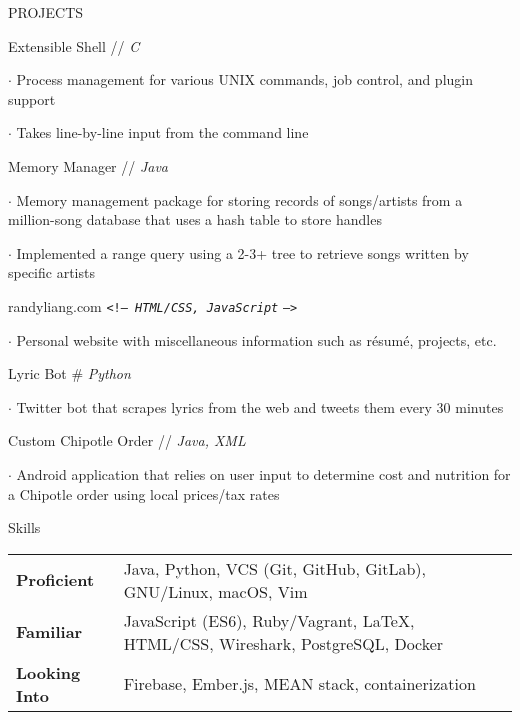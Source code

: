 \documentclass{resume} %
\begin{document}
\begin{rSection}{PROJECTS}

\begin{rSubsection}{Extensible Shell // \sl C}{}{}{} 
	\item[$\cdot$] Process management for various UNIX commands, job control, and plugin support
    \item[$\cdot$] Takes line-by-line input from the command line
\end{rSubsection}
\begin{rSubsection}{Memory Manager // \sl Java}{}{}{} 
	\item[$\cdot$] Memory management package for storing records of songs/artists from a million-song database that uses a hash table to store handles
    \item[$\cdot$] Implemented a range query using a 2-3+ tree to retrieve songs written by specific artists
\end{rSubsection}  
\begin{rSubsection}{ randyliang.com \texttt{<!-- \sl HTML/CSS, JavaScript} \texttt{-->}}{}{}{} 
	\item[$\cdot$] Personal website with miscellaneous information such as r\'esum\'e, projects, etc.
\end{rSubsection}  
\begin{rSubsection}{Lyric Bot \# \sl Python}{}{}{}  
	\item[$\cdot$] Twitter bot that scrapes lyrics from the web and tweets them every 30 minutes
\end{rSubsection}  
\begin{rSubsection}{Custom Chipotle Order // \sl Java, XML}{}{}{} 
	\item[$\cdot$] Android application that relies on user input to determine cost and nutrition for a Chipotle order using local prices/tax rates \\
\end{rSubsection}  

\end{rSection}

\begin{rSection}{Skills}

\begin{tabular}{ @{} >{\bfseries}l l }
Proficient   & Java, Python, VCS (Git, GitHub, GitLab), GNU/Linux, macOS, Vim   \\
Familiar     & JavaScript (ES6), Ruby/Vagrant, \LaTeX, HTML/CSS, Wireshark, PostgreSQL, Docker \\
Looking Into & Firebase, Ember.js, MEAN stack, containerization 
\end{tabular}

\end{rSection}
\end{document}
